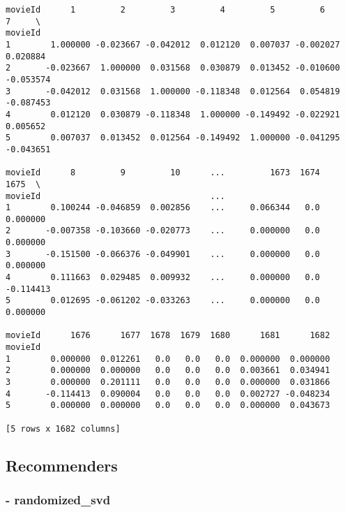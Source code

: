 \documentclass[11pt]{article}
\begin{document}
    \begin{verbatim}
movieId      1         2         3         4         5         6         7     \
movieId                                                                         
1        1.000000 -0.023667 -0.042012  0.012120  0.007037 -0.002027  0.020884   
2       -0.023667  1.000000  0.031568  0.030879  0.013452 -0.010600 -0.053574   
3       -0.042012  0.031568  1.000000 -0.118348  0.012564  0.054819 -0.087453   
4        0.012120  0.030879 -0.118348  1.000000 -0.149492 -0.022921  0.005652   
5        0.007037  0.013452  0.012564 -0.149492  1.000000 -0.041295 -0.043651   

movieId      8         9         10      ...         1673  1674      1675  \
movieId                                  ...                                
1        0.100244 -0.046859  0.002856    ...     0.066344   0.0  0.000000   
2       -0.007358 -0.103660 -0.020773    ...     0.000000   0.0  0.000000   
3       -0.151500 -0.066376 -0.049901    ...     0.000000   0.0  0.000000   
4        0.111663  0.029485  0.009932    ...     0.000000   0.0 -0.114413   
5        0.012695 -0.061202 -0.033263    ...     0.000000   0.0  0.000000   

movieId      1676      1677  1678  1679  1680      1681      1682  
movieId                                                            
1        0.000000  0.012261   0.0   0.0   0.0  0.000000  0.000000  
2        0.000000  0.000000   0.0   0.0   0.0  0.003661  0.034941  
3        0.000000  0.201111   0.0   0.0   0.0  0.000000  0.031866  
4       -0.114413  0.090004   0.0   0.0   0.0  0.002727 -0.048234  
5        0.000000  0.000000   0.0   0.0   0.0  0.000000  0.043673  

[5 rows x 1682 columns]
    \end{verbatim}

    
    \subsection{Recommenders}\label{recommenders}

\subsubsection{- randomized\_svd}\label{randomized_svd}
\end{document}
